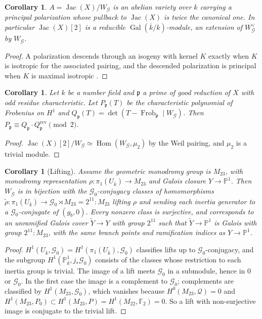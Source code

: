 \documentclass[11pt]{amsart}
\newtheorem{corollary}[theorem]{Corollary}
\theoremstyle{definition}
\newcommand{\FF}{\mathbb{F}}
\newcommand{\PP}{\mathbb{P}}
\newcommand{\kbar}{\overline{k}}
\newcommand{\Gal}{\operatorname{Gal}}
\newcommand{\Jac}{\operatorname{Jac}}
\newcommand{\Frob}{\operatorname{Frob}}
\newcommand{\rev}{\mathrm{rev}}
\newcommand{\M}{M_{23}}
\newcommand{\cG}{\mathcal{G}}
\newcommand{\cQ}{\mathcal{Q}}
\begin{document}
\begin{corollary}\label{cor:isogeny}
$A=\Jac(X)/W_\cG$ is an abelian variety over $k$ carrying a principal polarization whose pullback to $\Jac(X)$ is twice the canonical one. In particular $\Jac(X)[2]$ is a reducible $\Gal(\kbar/k)$-module, an extension of $W_\cG^\vee$ by $W_\cG$.
\end{corollary}
\begin{proof}
A polarization descends through an isogeny with kernel $K$ exactly when $K$ is isotropic for the associated pairing, and the descended polarization is principal when $K$ is maximal isotropic \cite[\S23]{Mumford}.
\end{proof}

\begin{corollary}\label{cor:Lpoly}
Let $k$ be a number field and $\mathfrak p$ a prime of good reduction of $X$ with odd residue characteristic. Let $P_{\mathfrak p}(T)$ be the characteristic polynomial of Frobenius on $H^1$ and $Q_{\mathfrak p}(T)=\det(T-\Frob_{\mathfrak p}\mid W_\cG)$. Then $P_{\mathfrak p}\equiv Q_{\mathfrak p}\cdot Q_{\mathfrak p}^{\rev}\pmod 2$.
\end{corollary}
\begin{proof}
$\Jac(X)[2]/W_\cG\simeq\operatorname{Hom}(W_\cG,\mu_2)$ by the Weil pairing, and $\mu_2$ is a trivial module.
\end{proof}

\begin{corollary}[Lifting]\label{cor:lifting}
Assume the geometric monodromy group is $\M$, with monodromy representation $\rho\colon\pi_1(U_{\kbar})\to\M$ and Galois closure $Y\to\PP^1$. Then $W_\cG$ is in bijection with the $\cG_0$-conjugacy classes of homomorphisms $\tilde\rho\colon\pi_1(U_{\kbar})\to\cG_0\rtimes\M=2^{11}{:}\M$ lifting $\rho$ and sending each inertia generator to a $\cG_0$-conjugate of $(g_b,0)$. Every nonzero class is surjective, and corresponds to an unramified Galois cover $\widetilde Y\to Y$ with group $2^{11}$ such that $\widetilde Y\to\PP^1$ is Galois with group $2^{11}{:}\M$, with the same branch points and ramification indices as $Y\to\PP^1$.
\end{corollary}
\begin{proof}
$H^1(U_{\kbar},\cG_0)=H^1(\pi_1(U_{\kbar}),\cG_0)$ classifies lifts up to $\cG_0$-conjugacy, and the subgroup $H^1(\PP^1_{\kbar},j_*\cG_0)$ consists of the classes whose restriction to each inertia group is trivial. The image of a lift meets $\cG_0$ in a submodule, hence in $0$ or $\cG_0$. In the first case the image is a complement to $\cG_0$; complements are classified by $H^1(\M,\cG_0)$, which vanishes because $H^0(\M,\cQ)=0$ and $H^1(\M,P_0)\subset H^1(\M,P)=H^1(M_{22},\FF_2)=0$. So a lift with non-surjective image is conjugate to the trivial lift.
\end{proof}
\end{document}
